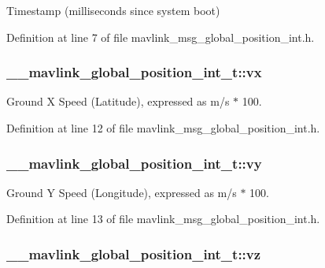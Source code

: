 Timestamp (milliseconds since system boot) 



Definition at line 7 of file mavlink\-\_\-msg\-\_\-global\-\_\-position\-\_\-int.\-h.

\hypertarget{struct____mavlink__global__position__int__t_a1f2bef1206e578e3f0f85f7854621829}{
\subsubsection[{vx}]{ \-\_\-\-\_\-mavlink\-\_\-global\-\_\-position\-\_\-int\-\_\-t\-::vx}}\label{struct____mavlink__global__position__int__t_a1f2bef1206e578e3f0f85f7854621829}


Ground X Speed (Latitude), expressed as m/s $\ast$ 100. 



Definition at line 12 of file mavlink\-\_\-msg\-\_\-global\-\_\-position\-\_\-int.\-h.

\hypertarget{struct____mavlink__global__position__int__t_a89734a8b924f059f9e634233ce021cd3}{
\subsubsection[{vy}]{ \-\_\-\-\_\-mavlink\-\_\-global\-\_\-position\-\_\-int\-\_\-t\-::vy}}\label{struct____mavlink__global__position__int__t_a89734a8b924f059f9e634233ce021cd3}


Ground Y Speed (Longitude), expressed as m/s $\ast$ 100. 



Definition at line 13 of file mavlink\-\_\-msg\-\_\-global\-\_\-position\-\_\-int.\-h.

\hypertarget{struct____mavlink__global__position__int__t_ac476cea996cb642f139a93fc7f5ed2a4}{
\subsubsection[{vz}]{ \-\_\-\-\_\-mavlink\-\_\-global\-\_\-position\-\_\-int\-\_\-t\-::vz}}\label{struct____mavlink__global__position__int__t_ac476cea996cb642f139a93fc7f5ed2a4}


